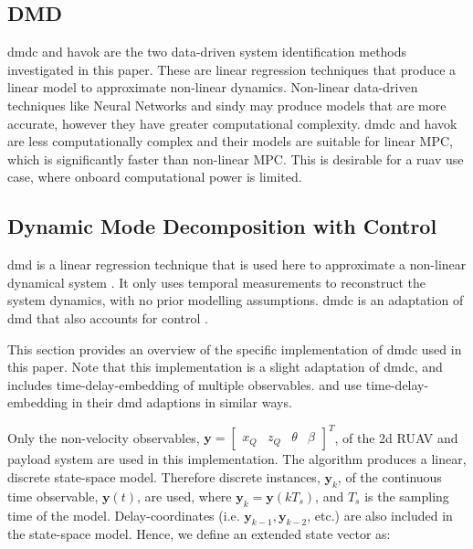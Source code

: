     \subsection{DMD}
    \gls{dmdc} and \gls{havok} are the two data-driven system identification methods investigated in this paper. 
    These are linear regression techniques that produce a linear model to approximate non-linear dynamics.
    Non-linear data-driven techniques like Neural Networks and \gls{sindy} \citep{Brunton2016} may produce models that are more accurate, however they have greater computational complexity.
    \gls{dmdc} and \gls{havok} are less computationally complex and their models are suitable for linear MPC, which is significantly faster than non-linear MPC.
    This is desirable for a \gls{ruav} use case, where onboard computational power is limited.
%
    \subsection{Dynamic Mode Decomposition with Control} \label{sec:dmdc}
% 
    \par
    \gls{dmd} is a linear regression technique that is used here to approximate a non-linear dynamical system \citep{Tu2014}.
    It only uses temporal measurements to reconstruct the system dynamics, with no prior modelling assumptions.
    \gls{dmdc} is an adaptation of \gls{dmd} that also accounts for control \citep{Proctor2016}.
% 
    \par
    This section provides an overview of the specific implementation of \gls{dmdc} used in this paper.
    Note that this implementation is a slight adaptation of \gls{dmdc}, and includes time-delay-embedding of multiple observables. 
    \citet{Korda2018} and \citet{Arbabi2017} use time-delay-embedding in their \gls{dmd} adaptions in similar ways.
% 
    \par
    Only the non-velocity observables,
    $\bm{y} = \begin{bmatrix}
        x_Q & z_Q & \theta & \beta
    \end{bmatrix}^T$,
    of the \gls{2d} RUAV and payload system are used in this implementation.
    The algorithm produces a linear, discrete state-space model.
    Therefore discrete instances, $\bm{y}_k$, of the continuous time observable, $\bm{y}(t)$, are used, where $\bm{y}_k = \bm{y}(k T_s)$, and $T_s$ is the sampling time of the model.    
    Delay-coordinates (i.e. $\bm{y}_{k-1}, \bm{y}_{k-2}$, etc.) are also included in the state-space model.
    Hence, we define an extended state vector as:
